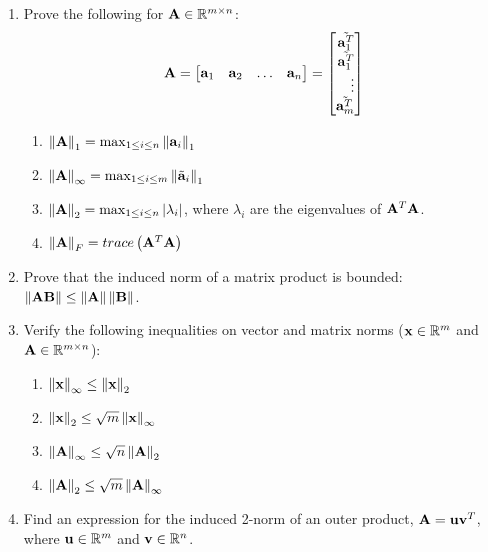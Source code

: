 \documentclass[9pt]{article}
\def\mf{\ensuremath\mathbf}
\def\mb{\ensuremath\mathbb}
\def\lp{\ensuremath\left(}
\def\rp{\ensuremath\right)}
\def\lv{\ensuremath\left\lvert}
\def\rv{\ensuremath\right\rvert}
\def\lV{\ensuremath\left\lVert}
\def\rV{\ensuremath\right\rVert}
\def\bmx{\ensuremath\begin{bmatrix*}[r]}
\def\emx{\ensuremath\end{bmatrix*}}
\begin{document}
\begin{multicols}{2}
\begin{enumerate}
    \item Prove the following for $\mf{A} \in \mb{R}^{m \times n}$:
    \[ \mf{A} = \bmx \mf{a}_1 & \mf{a}_2 & \ldots & \mf{a}_n\emx = \bmx \tilde{\mf{a}_1^T}\\ \tilde{\mf{a}_1^T} \\ \vdots \\ \tilde{\mf{a}_m^T}\emx \]
    \begin{enumerate}
        \item $\lV\mf{A}\rV_1 = \max_{1 \leq i \leq n} \lV\mf{a}_i\rV_1$
        \item $\lV\mf{A}\rV_\infty = \max_{1 \leq i \leq m} \lV\tilde{\mf{a}}_i\rV_1$
        \item $\lV\mf{A}\rV_2 = \max_{1 \leq i \leq n} \lv \lambda_i \rv$, where $\lambda_i$ are the eigenvalues of $\mf{A}^T\mf{A}$.
        \item $\lV\mf{A}\rV_F = trace\lp \mf{A}^T\mf{A}\rp$
    \end{enumerate}

    \item Prove that the induced norm of a matrix product is bounded: $\lV\mf{A}\mf{B}\rV \leq \lV\mf{A}\rV\lV\mf{B}\rV$.

    \item Verify the following inequalities on vector and matrix norms ($\mf{x} \in \mb{R}^m$ and $\mf{A} \in \mb{R}^{m \times n}$):
    \begin{enumerate}
        \item $\lV\mf{x}\rV_\infty \leq \lV\mf{x}\rV_2$
        \item $\lV\mf{x}\rV_2 \leq \sqrt{m}\lV\mf{x}\rV_\infty$
        \item $\lV\mf{A}\rV_\infty \leq \sqrt{n}\lV\mf{A}\rV_2$
        \item $\lV\mf{A}\rV_2 \leq \sqrt{m}\lV\mf{A}\rV_\infty$
    \end{enumerate}

    \item Find an expression for the induced 2-norm of an outer product, $\mf{A} = \mf{u}\mf{v}^T$, where $\mf{u} \in \mb{R}^m$ and $\mf{v} \in \mb{R}^n$.
\end{enumerate}

\end{multicols}
\end{document}
